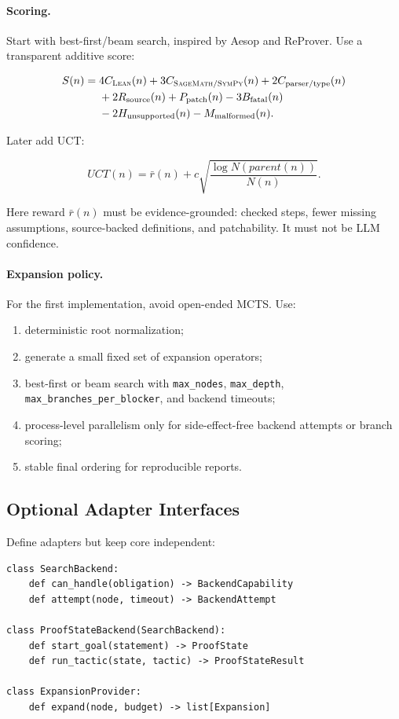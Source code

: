 \documentclass[11pt]{article}
\newcommand{\Lean}{\textsc{Lean}}
\newcommand{\Sage}{\textsc{SageMath}}
\newcommand{\SymPy}{\textsc{SymPy}}
\newcommand{\UCT}{\textsc{UCT}}
\begin{document}
\paragraph{Scoring.}
Start with best-first/beam search, inspired by Aesop and ReProver. Use a
transparent additive score:

\begin{align*}
  S(n)={}&
  4C_{\Lean}(n)
  + 3C_{\Sage/\SymPy}(n)
  + 2C_{\mathrm{parser/type}}(n) \\
  &+ 2R_{\mathrm{source}}(n)
  + P_{\mathrm{patch}}(n)
  - 3B_{\mathrm{fatal}}(n) \\
  &- 2H_{\mathrm{unsupported}}(n)
  - M_{\mathrm{malformed}}(n).
\end{align*}

Later add \UCT:

\[
  UCT(n) = \bar r(n) + c \sqrt{\frac{\log N(parent(n))}{N(n)}}.
\]

Here reward \(\bar r(n)\) must be evidence-grounded: checked steps, fewer
missing assumptions, source-backed definitions, and patchability. It must not
be LLM confidence.

\paragraph{Expansion policy.}
For the first implementation, avoid open-ended MCTS. Use:

\begin{enumerate}[leftmargin=*]
\item deterministic root normalization;
\item generate a small fixed set of expansion operators;
\item best-first or beam search with \texttt{max\_nodes}, \texttt{max\_depth},
  \texttt{max\_branches\_per\_blocker}, and backend timeouts;
\item process-level parallelism only for side-effect-free backend attempts or
  branch scoring;
\item stable final ordering for reproducible reports.
\end{enumerate}

\subsection{Optional Adapter Interfaces}

Define adapters but keep core independent:

\begin{verbatim}
class SearchBackend:
    def can_handle(obligation) -> BackendCapability
    def attempt(node, timeout) -> BackendAttempt

class ProofStateBackend(SearchBackend):
    def start_goal(statement) -> ProofState
    def run_tactic(state, tactic) -> ProofStateResult

class ExpansionProvider:
    def expand(node, budget) -> list[Expansion]
\end{verbatim}
\end{document}
